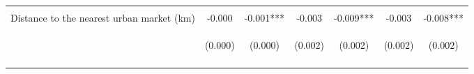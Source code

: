 \begin{center}
\begin{tabular}{lcccccc}
\vspace{4pt} & \begin{footnotesize}[0.007]\end{footnotesize} & \begin{footnotesize}[0.060]\end{footnotesize} & \begin{footnotesize}[0.674]\end{footnotesize} & \begin{footnotesize}[0.835]\end{footnotesize} & \begin{footnotesize}[0.827]\end{footnotesize} & \begin{footnotesize}[0.946]\end{footnotesize} \\
Distance to the nearest urban market (km) & -0.000 & -0.001*** & -0.003 & -0.009*** & -0.003 & -0.008*** \\
 & \begin{footnotesize}(0.000)\end{footnotesize} & \begin{footnotesize}(0.000)\end{footnotesize} & \begin{footnotesize}(0.002)\end{footnotesize} & \begin{footnotesize}(0.002)\end{footnotesize} & \begin{footnotesize}(0.002)\end{footnotesize} & \begin{footnotesize}(0.002)\end{footnotesize} \\
\vspace{4pt} & \begin{footnotesize}[0.154]\end{footnotesize} & \begin{footnotesize}[0.000]\end{footnotesize} & \begin{footnotesize}[0.101]\end{footnotesize} & \begin{footnotesize}[0.000]\end{footnotesize} & \begin{footnotesize}[0.100]\end{footnotesize} & \begin{footnotesize}[0.000]\end{footnotesize} \\

\end{tabular}
\end{center}
